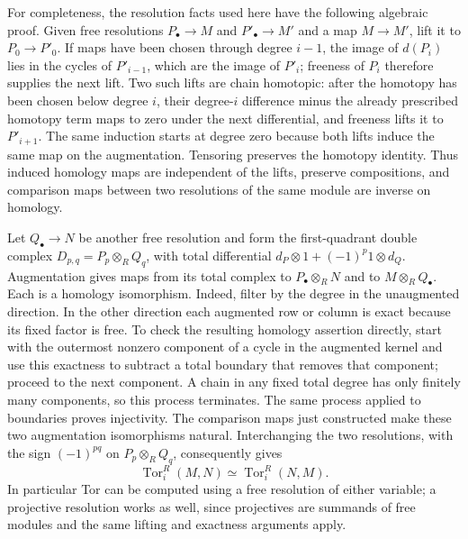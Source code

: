 \documentclass[11pt,a4paper,openany]{report}
\begin{document}
For completeness, the resolution facts used here have the following algebraic proof. Given free resolutions \(P_\bullet\to M\) and \(P'_\bullet\to M'\) and a map \(M\to M'\), lift it to \(P_0\to P'_0\). If maps have been chosen through degree \(i-1\), the image of \(d(P_i)\) lies in the cycles of \(P'_{i-1}\), which are the image of \(P'_i\); freeness of \(P_i\) therefore supplies the next lift. Two such lifts are chain homotopic: after the homotopy has been chosen below degree \(i\), their degree-\(i\) difference minus the already prescribed homotopy term maps to zero under the next differential, and freeness lifts it to \(P'_{i+1}\). The same induction starts at degree zero because both lifts induce the same map on the augmentation. Tensoring preserves the homotopy identity. Thus induced homology maps are independent of the lifts, preserve compositions, and comparison maps between two resolutions of the same module are inverse on homology.

Let \(Q_\bullet\to N\) be another free resolution and form the first-quadrant double complex \(D_{p,q}=P_p\otimes_R Q_q\), with total differential \(d_P\otimes1+(-1)^p1\otimes d_Q\). Augmentation gives maps from its total complex to \(P_\bullet\otimes_R N\) and to \(M\otimes_R Q_\bullet\). Each is a homology isomorphism. Indeed, filter by the degree in the unaugmented direction. In the other direction each augmented row or column is exact because its fixed factor is free. To check the resulting homology assertion directly, start with the outermost nonzero component of a cycle in the augmented kernel and use this exactness to subtract a total boundary that removes that component; proceed to the next component. A chain in any fixed total degree has only finitely many components, so this process terminates. The same process applied to boundaries proves injectivity. The comparison maps just constructed make these two augmentation isomorphisms natural. Interchanging the two resolutions, with the sign \((-1)^{pq}\) on \(P_p\otimes_RQ_q\), consequently gives \[
\operatorname{Tor}_i^R(M,N)\simeq\operatorname{Tor}_i^R(N,M).
\] In particular Tor can be computed using a free resolution of either variable; a projective resolution works as well, since projectives are summands of free modules and the same lifting and exactness arguments apply.
\end{document}
